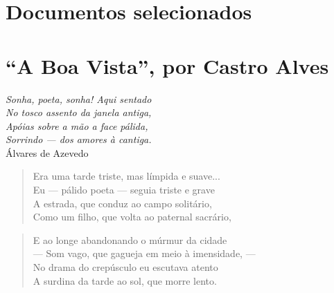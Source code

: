 \begin{anexosenv}
\chapter{Documentos selecionados}


\chapter{``A Boa Vista'', por Castro Alves}\label{cap:boavista}

\settowidth{\versewidth}{}

\begin{flushright}
\textit{Sonha, poeta, sonha! Aqui sentado \\
No tosco assento da janela antiga,\\
Apóias sobre a mão a face pálida,\\
Sorrindo — dos amores à cantiga.}\\
Álvares de Azevedo
\end{flushright}

\begin{verse}
Era uma tarde triste, mas límpida e suave... \\
Eu — pálido poeta — seguia triste e grave \\
A estrada, que conduz ao campo solitário, \\
Como um filho, que volta ao paternal sacrário, \\
\end{verse}

\begin{verse}
E ao longe abandonando o múrmur da cidade \\
— Som vago, que gagueja em meio à imensidade, — \\
No drama do crepúsculo eu escutava atento \\
A surdina da tarde ao sol, que morre lento. \\
\end{verse}


\end{anexosenv}
